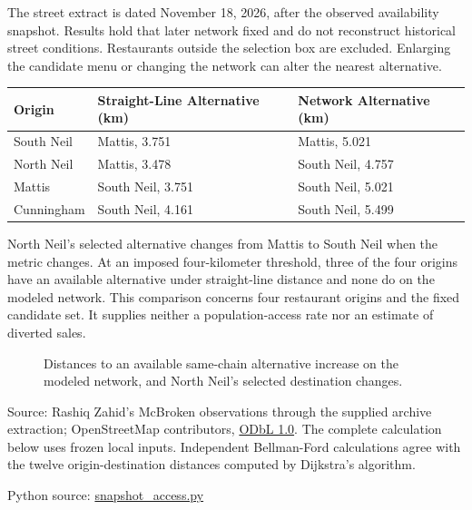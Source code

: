 The street extract is dated November 18, 2026, after the observed
availability snapshot. Results hold that later network fixed and do not
reconstruct historical street conditions. Restaurants outside the
selection box are excluded. Enlarging the candidate menu or changing the
network can alter the nearest alternative.

\begin{table}[H]
\centering\small
\begin{tabular}{@{}lll@{}}
\toprule
Origin & Straight-Line Alternative (km) & Network Alternative (km) \\
\midrule

South Neil & Mattis, 3.751 & Mattis, 5.021 \\
North Neil & Mattis, 3.478 & South Neil, 4.757 \\
Mattis & South Neil, 3.751 & South Neil, 5.021 \\
Cunningham & South Neil, 4.161 & South Neil, 5.499 \\
\bottomrule
\end{tabular}
\end{table}

North Neil's selected alternative changes from Mattis to South Neil when
the metric changes. At an imposed four-kilometer threshold, three of the
four origins have an available alternative under straight-line distance
and none do on the modeled network. This comparison concerns four
restaurant origins and the fixed candidate set. It supplies neither a
population-access rate nor an estimate of diverted sales.

\begin{figure}[htbp]
\centering

\caption{Distances to an available same-chain alternative increase on the modeled network, and North Neil’s selected destination changes.}\label{fig:M05_restaurant_distances}
\end{figure}

Source: Rashiq Zahid's McBroken observations through the supplied
archive extraction; OpenStreetMap contributors,
\href{https://opendatacommons.org/licenses/odbl/1-0/}{ODbL 1.0}. The
complete calculation below uses frozen local inputs. Independent
Bellman-Ford calculations agree with the twelve origin-destination
distances computed by Dijkstra's algorithm.

\FloatBarrier
{}
Python source:
\href{../03_Data_and_Code/Retail_Accessibility/snapshot_access.py}{snapshot\_access.py}

